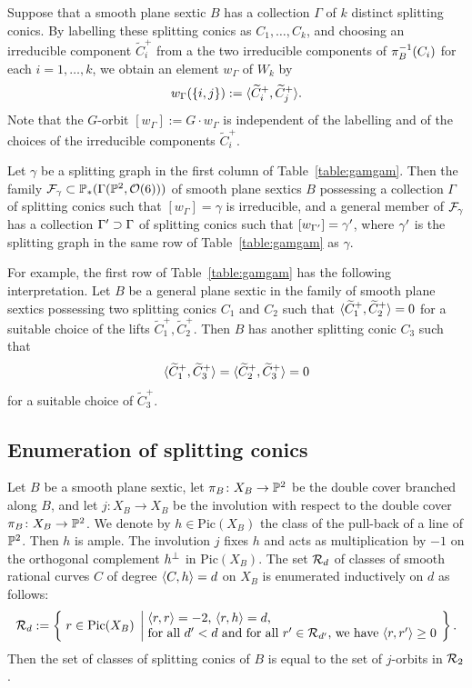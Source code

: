 \documentclass{amsart} %
\newcommand{\ps}{B}
\newcommand{\con}{C}
\newcommand{\wtcon}{\widetilde{\con}}
\newcommand{\pips}{\pi_{\ps}}
\newcommand{\Xps}{X_{\ps}}
\newcommand{\col}{\Gamma }
\newcommand{\gra}{w}
\newcommand{\Pic}{\mathrm{Pic}}
\begin{document}
%
Suppose that a smooth plane sextic $\ps$ has 
a collection $\col$ of $k$ distinct  splitting conics.
By  labelling  these splitting conics
as $\con_1, \dots, \con_k$,
and choosing an irreducible component 
$\wtcon_i^+$ from a the two irreducible components of 
 $\pips\inv (\con_i)$ for each $i=1, \dots, k$,
we obtain an element $\gra_{\col}$  of $W_k$  by 
\[
\gra_{\col}(\{i, j\}):=\intf{\wtcon_i^+, \wtcon_j^+}.
\]
Note that the $G$-orbit
$[\gra_{\col}]:=G\cdot \gra_{\col}$ 
is independent of the labelling and of the choices of the irreducible components
 $\wtcon_i^+$.
%
\begin{theorem}
Let $\gamma$ be a splitting graph in the first column of Table~\ref{table:gamgam}.
Then the family $\mathord{\mathcal{F}}_{\gamma}\subset \mathord{\mathbb{P}}_*(\Gamma(\mathord{\mathbb{P}}^2, \mathord{\mathcal{O}}(6)))$ of smooth plane sextics $\ps$ possessing a collection $\col$ 
of splitting conics such that $[\gra_{\col}]=\gamma$
is irreducible,
and a general member of $\mathord{\mathcal{F}}_{\gamma}$ 
has a collection $\col\sprime\supset \col$ 
of splitting conics such that $[\gra_{\col\sprime}]=\gamma\sprime$,
where $\gamma^{\prime}$ is the splitting graph 
in the same row of Table~\ref{table:gamgam} as $\gamma$.
\end{theorem}
%
For example, the first row of Table~\ref{table:gamgam} has the following interpretation.
Let  $\ps$ be a general plane sextic 
in the family of smooth plane sextics possessing 
two splitting conics $\con_1$ and $\con_2$
such that $\intf{\wtcon_1^+, \wtcon_2^+}=0$  for a suitable choice of the lifts 
$\wtcon_1^+, \wtcon_2^+$.
Then  $\ps$ has another  splitting conic $\con_3$ such that 
\[
\intf{\wtcon_1^+, \wtcon_3^+}=\intf{\wtcon_2^+, \wtcon_3^+}=0
\]
for a suitable choice of $\wtcon_3^+$.
%
\subsection{Enumeration of splitting conics}\label{subsec:enum}
%
Let $\ps$ be a smooth plane sextic,
 let $\pips\colon \Xps\to \PP^2$ be the double cover branched along $\ps$,
 and let $j\colon X_{\ps}\to X_{\ps}$ be the involution 
 with respect to the double cover $\pips\colon \Xps\to \PP^2$.
We denote by  $h\in  \Pic(\Xps)$   the class  of the pull-back of a line of $\mathord{\mathbb{P}}^2$.
Then $h$ is ample.
The involution $j$
fixes $h$ and acts as multiplication by $-1$
on the orthogonal complement $h^{\perp}$ in $ \Pic(\Xps)$.
The set $\mathord{\mathcal{R}}_d$ of classes of smooth rational curves $C$ of 
degree $\langle C, h \rangle=d$ on $X_{\ps}$ 
is  enumerated 
inductively on $d$ as follows:
\[
\RRR_d:=\bigset{r\in \Pic(X_{\ps})}
{\parbox{8cm}{$\intf{r, r}=-2$, $\intf{r, h}=d$, \\
for all $d\sprime<d$ and for all $r\sprime\in \RRR_{d\sprime}$, we have 
$\intf{r, r\sprime}\ge 0$}
}.
\]
Then the set of classes of splitting conics of $\ps$ is equal to 
the set of $j$-orbits in $\mathord{\mathcal{R}}_2$.
%
\end{document}
